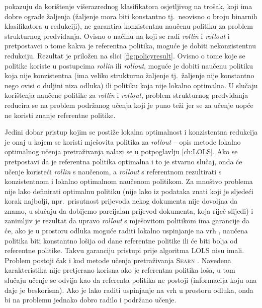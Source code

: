 \cite{daume15lols} pokazuju da korištenje višerazrednog klasifikatora
osjetljivog na trošak, koji ima dobre ograde žaljenja (žaljenje mora biti
konstantno tj.~neovisno o broju binarnih klasifikatora u redukciji), ne
garantira konzistentnu naučenu politiku za problem strukturnog predviđanja.
Ovisno o načinu na koji se radi \textit{rollin} i \textit{rollout} i
pretpostavci o tome kakva je referentna politika, moguće je dobiti
nekonzistentnu redukciju. Rezultat je priložen na slici \ref{fig:policyresult}.
Ovisno o tome koje se politike koriste u postupcima \textit{rollin} ili
\textit{rollout}, moguće je dobiti naučenu politiku koja nije konzistentna (ima
veliko strukturno žaljenje tj.~žaljenje nije konstantno nego ovisi o duljini
niza odluka) ili politiku koja nije lokalno optimalna. U slučaju korištenja
naučene politike za \textit{rollin} i \textit{rollout}, problem strukturnog
predviđanja reducira se na problem podržanog učenja koji je puno teži jer se za
učenje uopće ne koristi znanje referentne politike.

Jedini dobar pristup kojim se postiže lokalna optimalnost i konzistentna
redukcija je onaj u kojem se koristi mješovita politika za \textit{rollout} --
opis metode lokalno optimalnog učenja pretraživanja nalazi se u potpoglavlju
\ref{ch:LOLS}. Ako se pretpostavi da je referentna politika optimalna i to je
stvarno slučaj, onda će učenje koristeći \textit{rollin} s naučenom, a
\textit{rollout} s referentnom rezultirati s konzistentnom i lokalno optimalnom
naučenom politikom. Za mnoštvo problema nije lako definirati optimalnu politiku
(nije lako iz podataka znati koji je sljedeći korak najbolji, npr.~prisutnost
prijevoda nekog dokumenta nije dovoljna da znamo, u slučaju da dobijemo
parcijalan prijevod dokumenta, koja riječ slijedi) i zanimljiv je rezultat da
upravo \textit{rollout} s mješovitom politikom ima garancije da će, ako je u
prostoru odluka moguće raditi lokalno uspinjanje na vrh , naučena politika biti konstantno lošija od dane referentne politike
ili će biti bolja od referentne politike. Takvu garanciju pristupi prije
algoritma \textsc{LOLS} nisu imali. Problem postoji čak i kod metode učenja
pretraživanja \textsc{Searn} \citep{daume15lols}. Navedena karakteristika nije
pretjerano korisna ako je referentna politika loša, u tom slučaju učenje se
odvija kao da referenta politika ne postoji (informacija koju ona daje je
beskorisna). Ako je lako raditi uspinjanje na vrh u prostoru odluka, onda bi na
problemu jednako dobro radilo i podržano učenje.

